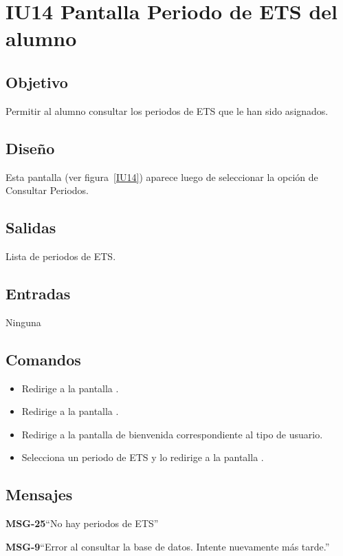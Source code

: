 \section{IU14 Pantalla Periodo de ETS del alumno}

\subsection{Objetivo}
	Permitir al alumno consultar los periodos de ETS que le han sido asignados. 

\subsection{Diseño}
	Esta pantalla  (ver figura~\ref{IU14}) aparece luego de seleccionar la opción de Consultar Periodos.


\subsection{Salidas}
	Lista de periodos de ETS. 

\subsection{Entradas}
Ninguna

\subsection{Comandos}

\begin{itemize}
	\item {} Redirige a la pantalla .
	\item {} Redirige a la pantalla .
	\item {} Redirige a la pantalla de bienvenida correspondiente al tipo de usuario.
	\item {} Selecciona un periodo de ETS y lo redirige a la pantalla .
\end{itemize}

\subsection{Mensajes}

\begin{Citemize}
	\item {\bf MSG-25}{``No hay periodos de ETS''}
	\item {\bf MSG-9}{``Error al consultar la base de datos. Intente nuevamente más tarde.''}
\end{Citemize}

